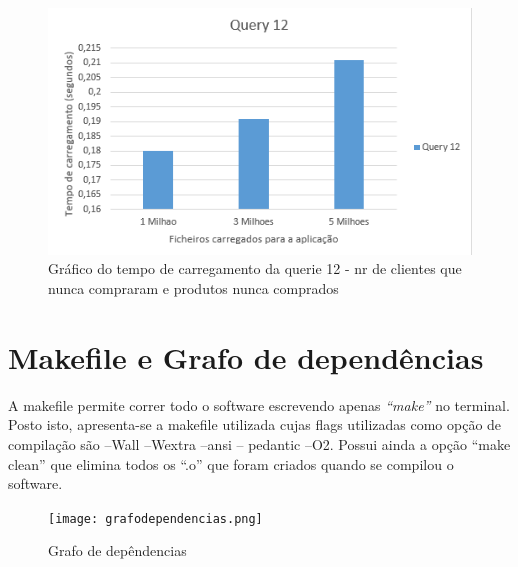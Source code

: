   	
  	\begin{figure}[h!]
  		\centering
  		\includegraphics[scale=0.7]{grafq12}  
  		\caption{Gráfico do tempo de carregamento da querie 12 - nr de clientes que nunca compraram e produtos nunca comprados}  
  	\end{figure}





\chapter{Makefile e Grafo de dependências}
A makefile permite correr todo o software escrevendo apenas \textit{“make”} no terminal. Posto isto, apresenta-se a makefile utilizada cujas flags utilizadas como opção de compilação são –Wall –Wextra –ansi – pedantic –O2.
Possui ainda a opção “make clean” que elimina todos os “.o” que foram criados quando se compilou o software.

\begin{figure}[h!]
	\centering
	\texttt{[image: grafodependencias.png]}  
	\caption{Grafo de depêndencias}  
\end{figure}

